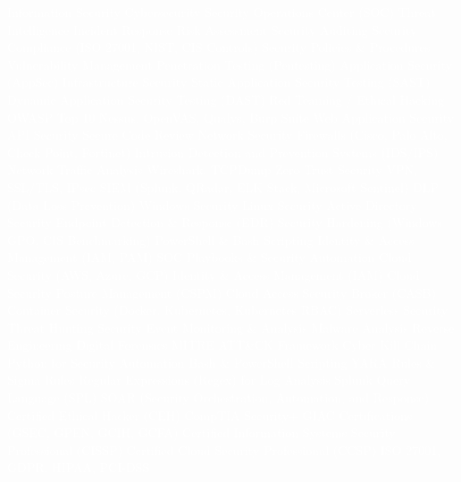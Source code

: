 \documentclass{resume} %
\begin{document}

\textcolor{white}{\fontsize{1}{1.2}\selectfont
Information Security
Cybersecurity
Security Operations Center (SOC)
Threat Intelligence
Incident Response
Risk Assessment
Security Auditing
Security Compliance (ISO 27001, NIST, CIS Controls)
Security Policies \& Procedures
Vulnerability Management
Penetration Testing (Pentesting)
Application Security (AppSec)
Infrastructure Security
Static Application Security Testing (SAST)
Dynamic Application Security Testing (DAST)
Red Teaming / Ethical Hacking
OWASP Top 10
Nessus, OpenVAS, Qualys, Burp Suite
Web Application Security
API Security
Secure Code Review
Network Security
Firewalls (Cisco, Palo Alto, Check Point, Fortinet)
Intrusion Detection and Prevention Systems (IDS/IPS)
Network Traffic Analysis
Wireshark, TCPDump
Zero Trust Security
VPN, SSL/TLS, IPsec
SIEM (Splunk, QRadar, ELK Stack, Microsoft Sentinel)
DLP (Data Loss Prevention)
Windows Security
Linux Security
Active Directory Security
Endpoint Detection \& Response (EDR)
Security Hardening (Windows GPO, CIS Benchmarking)
PowerShell \& Bash Scripting
Identity \& Access Management (IAM, PAM)
SOC Playbooks \& Security Automation
Cloud Security (AWS, Azure, GCP)
Identity \& Access Management (IAM)
Cloud Security Posture Management (CSPM)
Cloud Access Security Broker (CASB)
Container Security (Docker, Kubernetes, Kubernetes RBAC)
Serverless Security
Threat Hunting
Security Event Monitoring \& Analysis
Malware Analysis
Reverse Engineering
Digital Forensics
MITRE ATT\&CK Framework
Cyber Kill Chain
Python for Security Automation
Bash \& PowerShell Scripting
YARA Rules \& Sigma Rules
Regular Expressions (Regex) for Log Analysis
Splunk Query Language (SPL)
SOAR (Security Orchestration, Automation, and Response)
Certified Ethical Hacker (CEH)
CompTIA Security+
GIAC Certifications (GSEC, GPEN, GCIH, GCFA)
Certified Information Systems Security Professional (CISSP)
Certified Cloud Security Professional (CCSP)
ISO 27001, GDPR, HIPAA, PCI-DSS
}
\end{document}
